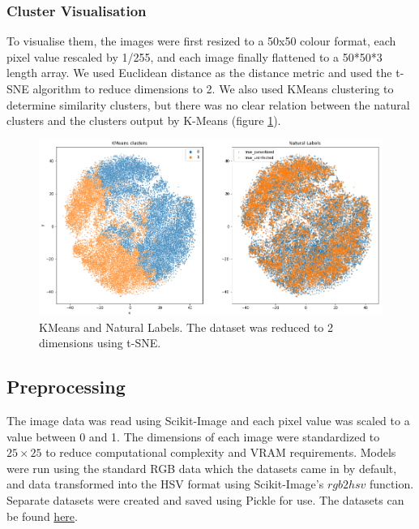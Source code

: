 \documentclass[10pt,twocolumn,letterpaper]{article}
\begin{document}
\subsubsection{Cluster Visualisation}
To visualise them, the images were first resized to a 50x50 colour format, each pixel value rescaled by 1/255, and each image finally flattened to a 50*50*3 length array. We used Euclidean distance as the distance metric and used the t-SNE algorithm to reduce dimensions to 2. We also used KMeans clustering to determine similarity clusters, but there was no clear relation between the natural clusters and the clusters output by K-Means (figure \ref{fig:tsne_vis}).

\begin{figure}[t]
   \begin{center}
      \includegraphics[width=1\linewidth]{../Plots/kmeans_natural labels.png}
   \end{center}
      \caption{KMeans and Natural Labels. The dataset was reduced to 2 dimensions using t-SNE.}
   \label{fig:tsne_vis}
\end{figure}

\subsection{Preprocessing}
The image data was read using Scikit-Image and each pixel value was scaled to a value between 0 and 1. The dimensions of each image were standardized to $25 \times 25$ to reduce computational complexity and VRAM requirements. Models were run using the standard RGB data which the datasets came in by default, and data transformed into the HSV format using Scikit-Image's $rgb2hsv$ function. Separate datasets were created and saved using Pickle for use. The datasets can be found \href{https://drive.google.com/drive/folders/1rKEHtQ_Sr2vU01yj_xC_ODwUp8QesxWY?usp=share_link}{here}.
\end{document}
